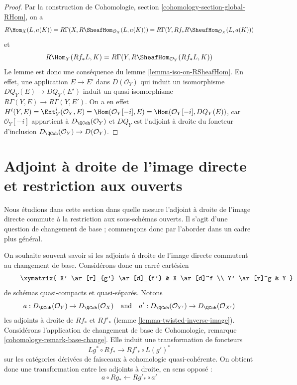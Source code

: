 \begin{proof}
Par la construction de Cohomologie, section \ref{cohomology-section-global-RHom}, on a
$$
R\Hom_X(L, a(K)) =
R\Gamma(X, R\SheafHom_{\mathcal{O}_X}(L, a(K))) =
R\Gamma(Y, Rf_*R\SheafHom_{\mathcal{O}_X}(L, a(K)))
$$
et
$$
R\Hom_Y(Rf_*L, K) = R\Gamma(Y, R\SheafHom_{\mathcal{O}_Y}(Rf_*L, K))
$$
Le lemme est donc une conséquence du lemme \ref{lemma-iso-on-RSheafHom}. En effet, une application $E \to E'$ dans $D(\mathcal{O}_Y)$ qui induit un isomorphisme $DQ_Y(E) \to DQ_Y(E')$ induit un quasi-isomorphisme $R\Gamma(Y, E) \to R\Gamma(Y, E')$. On a en effet $H^i(Y, E) = \Ext^i_Y(\mathcal{O}_Y, E) = \Hom(\mathcal{O}_Y[-i], E) =
\Hom(\mathcal{O}_Y[-i], DQ_Y(E))$, car $\mathcal{O}_Y[-i]$ appartient à $D_\QCoh(\mathcal{O}_Y)$ et $DQ_Y$ est l'adjoint à droite du foncteur d'inclusion $D_\QCoh(\mathcal{O}_Y) \to D(\mathcal{O}_Y)$.
\end{proof}







\section{Adjoint à droite de l'image directe et restriction aux ouverts}
\label{section-restriction-to-opens}

\noindent
Nous étudions dans cette section dans quelle mesure l'adjoint à droite de l'image directe commute à la restriction aux sous-schémas ouverts. Il s'agit d'une question de changement de base ; commençons donc par l'aborder dans un cadre plus général.

\medskip\noindent
On souhaite souvent savoir si les adjoints à droite de l'image directe commutent au changement de base. Considérons donc un carré cartésien
\begin{equation}
\label{equation-base-change}
\vcenter{
\xymatrix{
X' \ar[r]_{g'} \ar[d]_{f'} & X \ar[d]^f \\
Y' \ar[r]^g & Y
}
}
\end{equation}
de schémas quasi-compacts et quasi-séparés. Notons
$$
a  : D_\QCoh(\mathcal{O}_Y) \to D_\QCoh(\mathcal{O}_X)
\quad\text{and}\quad
a'  : D_\QCoh(\mathcal{O}_{Y'}) \to D_\QCoh(\mathcal{O}_{X'})
$$
les adjoints à droite de $Rf_*$ et $Rf'_*$ (lemme \ref{lemma-twisted-inverse-image}). Considérons l'application de changement de base de Cohomologie, remarque \ref{cohomology-remark-base-change}. Elle induit une transformation de foncteurs
$$
Lg^* \circ Rf_* \longrightarrow Rf'_* \circ L(g')^*
$$
sur les catégories dérivées de faisceaux à cohomologie quasi-cohérente. On obtient donc une transformation entre les adjoints à droite, en sens opposé :
$$
a \circ Rg_* \longleftarrow Rg'_* \circ a'
$$

